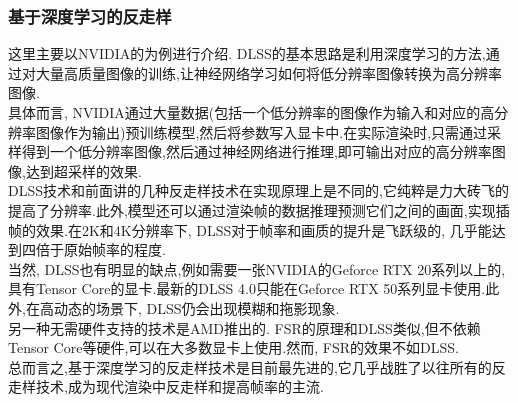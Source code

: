 \documentclass{ctexart}
\begin{document}
\subsubsection{基于深度学习的反走样}
这里主要以NVIDIA的为例进行介绍. DLSS的基本思路是利用深度学习的方法,通过对大量高质量图像的训练,让神经网络学习如何将低分辨率图像转换为高分辨率图像.\\
\indent 具体而言, NVIDIA通过大量数据(包括一个低分辨率的图像作为输入和对应的高分辨率图像作为输出)预训练模型,然后将参数写入显卡中.在实际渲染时,只需通过采样得到一个低分辨率图像,然后通过神经网络进行推理,即可输出对应的高分辨率图像,达到超采样的效果.\\
\indent DLSS技术和前面讲的几种反走样技术在实现原理上是不同的,它纯粹是力大砖飞的提高了分辨率.此外,模型还可以通过渲染帧的数据推理预测它们之间的画面,实现插帧的效果.在2K和4K分辨率下, DLSS对于帧率和画质的提升是飞跃级的, 几乎能达到四倍于原始帧率的程度.\\
\indent 当然, DLSS也有明显的缺点,例如需要一张NVIDIA的Geforce RTX 20系列以上的,具有Tensor Core的显卡.最新的DLSS 4.0只能在Geforce RTX 50系列显卡使用.此外,在高动态的场景下, DLSS仍会出现模糊和拖影现象.\\
\indent 另一种无需硬件支持的技术是AMD推出的. FSR的原理和DLSS类似,但不依赖Tensor Core等硬件,可以在大多数显卡上使用.然而, FSR的效果不如DLSS.\\
\indent 总而言之,基于深度学习的反走样技术是目前最先进的,它几乎战胜了以往所有的反走样技术,成为现代渲染中反走样和提高帧率的主流.
\end{document}
